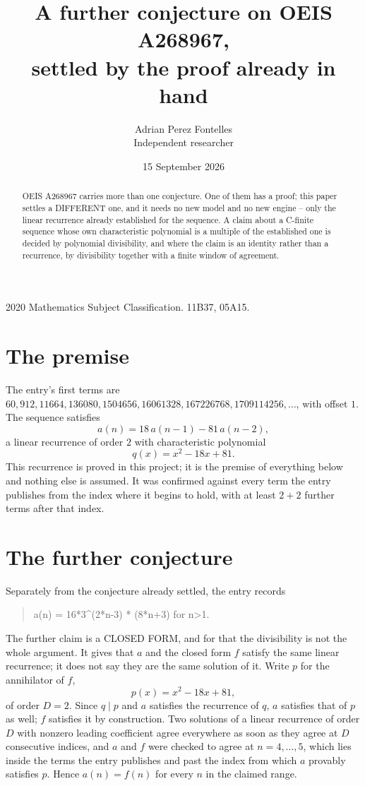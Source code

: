 \documentclass[11pt,a4paper]{article}
\title{A further conjecture on OEIS A268967,\\ \large settled by the proof already in hand}
\author{Adrian Perez Fontelles\\ \small Independent researcher}
\date{15 September 2026}
\theoremstyle{plain}
\theoremstyle{definition}
\begin{document}
\maketitle

\begin{abstract}
OEIS A268967 carries more than one conjecture. One of them has a proof; this paper settles a
DIFFERENT one, and it needs no new model and no new engine -- only the linear recurrence already
established for the sequence. A claim about a C-finite sequence whose own characteristic
polynomial is a multiple of the established one is decided by polynomial divisibility, and where
the claim is an identity rather than a recurrence, by divisibility together with a finite window
of agreement.
\end{abstract}

\noindent\small 2020 Mathematics Subject Classification. 11B37, 05A15.\normalsize

\section{The premise}

The entry's first terms are $60, 912, 11664, 136080, 1504656, 16061328, 167226768, 1709114256,\dots$, with offset $1$. The sequence satisfies
\[
  a(n)=18\,a(n-1) - 81\,a(n-2) ,
\]
a linear recurrence of order $2$ with characteristic polynomial
\[
  q(x)=x^{2} - 18 x + 81 .
\]
This recurrence is proved in this project; it is the premise of everything below and nothing else is assumed.
It was confirmed against every term the entry publishes from the index where it begins to hold,
with at least $2+2$ further terms after that index.

\section{The further conjecture}

Separately from the conjecture already settled, the entry records

\begin{quote}\raggedright a(n) = 16*3\^{}(2*n-3) * (8*n+3) for n>1.\end{quote}

The further claim is a CLOSED FORM, and for that the divisibility is not the whole argument. It
gives that $a$ and the closed form $f$ satisfy the same linear recurrence; it does not say they
are the same solution of it. Write $p$ for the annihilator of $f$,
\[
  p(x)=x^{2} - 18 x + 81 ,
\]
of order $D=2$. Since $q\mid p$ and $a$ satisfies the recurrence of $q$, $a$ satisfies that of
$p$ as well; $f$ satisfies it by construction. Two solutions of a linear recurrence of order $D$
with nonzero leading coefficient agree everywhere as soon as they agree at $D$ consecutive
indices, and $a$ and $f$ were checked to agree at $n=4,\dots,5$,
which lies inside the terms the entry publishes and past the index from which $a$ provably
satisfies $p$. Hence $a(n)=f(n)$ for every $n$ in the claimed range.
\end{document}
